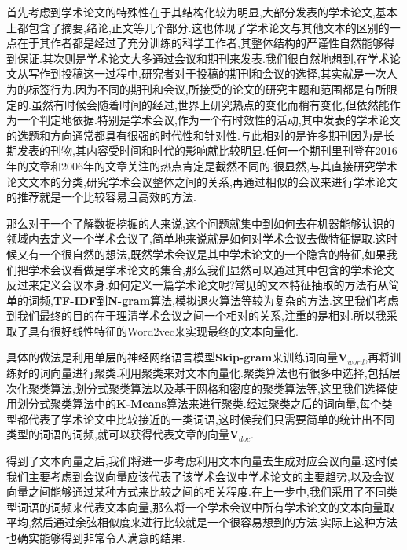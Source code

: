 首先考虑到学术论文的特殊性在于其结构化较为明显,大部分发表的学术论文,基本上都包含了摘要,绪论,正文等几个部分.这也体现了学术论文与其他文本的区别的一点在于其作者都是经过了充分训练的科学工作者,其整体结构的严谨性自然能够得到保证.其次则是学术论文大多通过会议和期刊来发表.我们很自然地想到,在学术论文从写作到投稿这一过程中,研究者对于投稿的期刊和会议的选择,其实就是一次人为的标签行为.因为不同的期刊和会议,所接受的论文的研究主题和范围都是有所限定的.虽然有时候会随着时间的经过,世界上研究热点的变化而稍有变化,但依然能作为一个判定地依据.特别是学术会议,作为一个有时效性的活动,其中发表的学术论文的选题和方向通常都具有很强的时代性和针对性.与此相对的是许多期刊因为是长期发表的刊物,其内容受时间和时代的影响就比较明显.任何一个期刊里刊登在2016年的文章和2006年的文章关注的热点肯定是截然不同的.很显然,与其直接研究学术论文文本的分类,研究学术会议整体之间的关系,再通过相似的会议来进行学术论文的推荐就是一个比较容易且高效的方法.

那么对于一个了解数据挖掘的人来说,这个问题就集中到如何去在机器能够认识的领域内去定义一个学术会议了,简单地来说就是如何对学术会议去做特征提取.这时候又有一个很自然的想法,既然学术会议是其中学术论文的一个隐含的特征,如果我们把学术会议看做是学术论文的集合,那么我们显然可以通过其中包含的学术论文反过来定义会议本身.如何定义一篇学术论文呢?常见的文本特征抽取的方法有从简单的词频,\textbf{TF-IDF}到\textbf{N-gram}算法,模拟退火算法等较为复杂的方法.这里我们考虑到我们最终的目的在于理清学术会议之间一个相对的关系,注重的是相对.所以我采取了具有很好线性特征的Word2vec\cite{mikolov2013distributed,mikolov2013efficient}来实现最终的文本向量化.

具体的做法是利用单层的神经网络语言模型\textbf{Skip-gram}来训练词向量$\mathbf{V}_{word}$,再将训练好的词向量进行聚类.利用聚类来对文本向量化.聚类算法也有很多中选择,包括层次化聚类算法,划分式聚类算法以及基于网格和密度的聚类算法等\cite{孙吉贵2008聚类算法研究},这里我们选择使用划分式聚类算法中的\textbf{K-Means}算法来进行聚类.经过聚类之后的词向量,每个类型都代表了学术论文中比较接近的一类词语,这时候我们只需要简单的统计出不同类型的词语的词频,就可以获得代表文章的向量$\mathbf{V}_{doc}$.

得到了文本向量之后,我们将进一步考虑利用文本向量去生成对应会议向量.这时候我们主要考虑到会议向量应该代表了该学术会议中学术论文的主要趋势,以及会议向量之间能够通过某种方式来比较之间的相关程度.在上一步中,我们采用了不同类型词语的词频来代表文本向量,那么将一个学术会议中所有学术论文的文本向量取平均,然后通过余弦相似度来进行比较就是一个很容易想到的方法.实际上这种方法也确实能够得到非常令人满意的结果.





